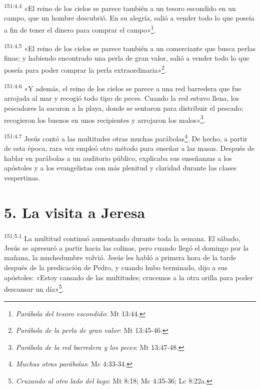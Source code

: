 \par 
\textsuperscript{151:4.4} «El reino de los cielos se parece también a un tesoro escondido en un campo, que un hombre descubrió. En su alegría, salió a vender todo lo que poseía a fin de tener el dinero para comprar el campo»\footnote{\textit{Parábola del tesoro escondido}: Mt 13:44.}.

\par 
\textsuperscript{151:4.5} «El reino de los cielos se parece también a un comerciante que busca perlas finas; y habiendo encontrado una perla de gran valor, salió a vender todo lo que poseía para poder comprar la perla extraordinaria»\footnote{\textit{Parábola de la perla de gran valor}: Mt 13:45-46.}.

\par 
\textsuperscript{151:4.6} «Y además, el reino de los cielos se parece a una red barredera que fue arrojada al mar y recogió todo tipo de peces. Cuando la red estuvo llena, los pescadores la sacaron a la playa, donde se sentaron para distribuir el pescado; recogieron los buenos en unos recipientes y arrojaron los malos»\footnote{\textit{Parábola de la red barredera y los peces}: Mt 13:47-48.}.

\par 
\textsuperscript{151:4.7} Jesús contó a las multitudes otras muchas parábolas\footnote{\textit{Muchas otras parábolas}: Mc 4:33-34.}. De hecho, a partir de esta época, rara vez empleó otro método para enseñar a las masas. Después de hablar en parábolas a un auditorio público, explicaba sus enseñanzas a los apóstoles y a los evangelistas con más plenitud y claridad durante las clases vespertinas.

\section*{5. La visita a Jeresa}
\par 
\textsuperscript{151:5.1} La multitud continuó aumentando durante toda la semana. El sábado, Jesús se apresuró a partir hacia las colinas, pero cuando llegó el domingo por la mañana, la muchedumbre volvió. Jesús les habló a primera hora de la tarde después de la predicación de Pedro, y cuando hubo terminado, dijo a sus apóstoles: «Estoy cansado de las multitudes; crucemos a la otra orilla para poder descansar un día»\footnote{\textit{Cruzando al otro lado del lago}: Mt 8:18; Mc 4:35-36; Lc 8:22a.}.

